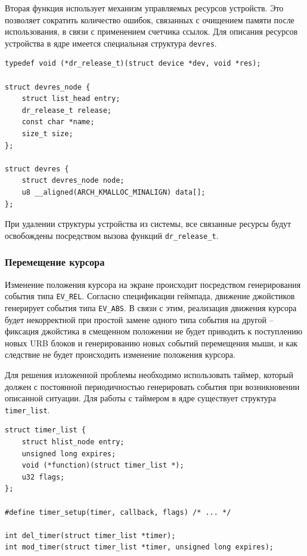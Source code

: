 Вторая функция использует механизм управляемых ресурсов устройств. Это позволяет сократить количество ошибок, связанных с очищением памяти после использования, в связи с применением счетчика ссылок. Для описания ресурсов устройства в ядре имеется специальная структура \texttt{devres}.

\begin{small}
\begin{verbatim}
typedef void (*dr_release_t)(struct device *dev, void *res);

struct devres_node {
    struct list_head entry;
    dr_release_t release;
    const char *name;
    size_t size;
};

struct devres {
    struct devres_node node;
    u8 __aligned(ARCH_KMALLOC_MINALIGN) data[];
};
\end{verbatim}
\end{small}

При удалении структуры устройства из системы, все связанные ресурсы будут освобождены посредством вызова функций \texttt{dr\_release\_t}.

\subsubsection{Перемещение курсора}

Изменение положения курсора на экране происходит посредством генерирования события типа \texttt{EV\_REL}. Согласно спецификации геймпада, движение джойстиков генерирует события типа \texttt{EV\_ABS}. В связи с этим, реализация движения курсора будет некорректной при простой замене одного типа события на другой -- фиксация джойстика в смещенном положении не будет приводить к поступлению новых URB блоков и генерированию новых событий перемещения мыши, и как следствие не будет происходить изменение положения курсора.

Для решения изложенной проблемы необходимо использовать таймер, который должен с постоянной периодичностью генерировать события при возникновении описанной ситуации. Для работы с таймером в ядре существует структура \texttt{timer\_list}.

\begin{small}
\begin{verbatim}
struct timer_list {
    struct hlist_node entry;
    unsigned long expires;
    void (*function)(struct timer_list *);
    u32	flags;
};

#define timer_setup(timer, callback, flags) /* ... */

int del_timer(struct timer_list *timer);
int mod_timer(struct timer_list *timer, unsigned long expires);
\end{verbatim}
\end{small}

